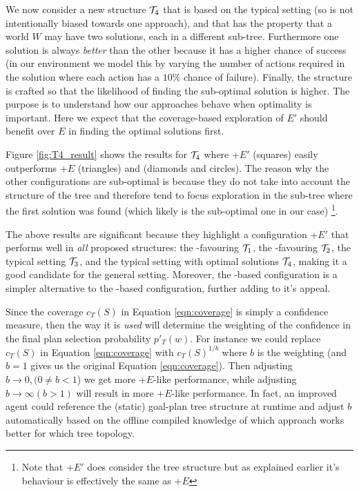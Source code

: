 We now consider a new structure ${\mathcal{T}}_4$ that is based on the typical setting (so
is not intentionally biased towards one approach), and that has the property that
a world $W$ may have two solutions, each in a different sub-tree. Furthermore one
solution is always \textit{better} than the other because it has a higher chance
of success (in our environment we model this by varying the number of actions
required in the solution where each action has a $10\%$ chance of failure).
Finally, the structure is crafted so that the likelihood of finding the
sub-optimal solution is higher. The purpose is to understand how our approaches
behave when optimality is important. Here we expect that the coverage-based
exploration of $E'$ should benefit over $E$ in finding the optimal solutions
first.


Figure \ref{fig:T4_result} shows the results for ${\mathcal{T}}_4$ where \CL+$E'$ (squares)
easily outperforms \CL+$E$ (triangles) and \BUL (diamonds and circles). The
reason why the other configurations are sub-optimal is because they do not take
into account the structure of the tree and therefore tend to focus exploration in
the sub-tree where the first solution was found (which likely is the sub-optimal
one in our case) \footnote{Note that \BUL+$E'$ does consider the tree structure
but as explained earlier it's behaviour is effectively the same as \BUL+$E$}.


The above results are significant because they highlight a configuration \CL+$E'$ that performs well in \textit{all} proposed structures: the \CL-favouring ${\mathcal{T}}_1$, the \BUL-favouring ${\mathcal{T}}_2$, the typical setting ${\mathcal{T}}_3$, and the typical setting with optimal solutions ${\mathcal{T}}_4$, making it a good candidate for the general setting. Moreover, the \CL-based configuration is a simpler alternative to the \BUL-based configuration, further adding to it's appeal.

Since the
coverage $c_T(S)$ in Equation \ref{eqn:coverage} is simply a
confidence measure, then the way it is \textit{used} will determine
the weighting of the confidence in the final plan selection
probability $p'_T(w)$. For instance we could replace $c_T(S)$ in
Equation \ref{eqn:coverage} with $c_T(S)^{1/b}$ where $b$ is the
weighting (and $b=1$ gives us the original Equation
\ref{eqn:coverage}). Then adjusting $b \rightarrow 0, (0 \ne b < 1$)
we get more \BUL+$E$-like performance, while adjusting $b \rightarrow
\infty (b > 1)$ will result in more \CL+$E$-like performance. In fact,
an improved agent could reference the (static) goal-plan tree
structure at runtime and adjust $b$ automatically based on the offline
compiled knowledge of which approach works better for which tree
topology. 

